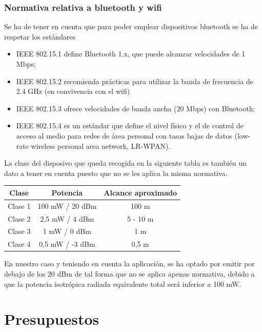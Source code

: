 \documentclass[paper=a4, fontsize=11pt,twoside]{scrartcl}	%
\begin{document}
        \subsubsection{Normativa relativa a bluetooth y wifi}
            Se ha de tener en cuenta que para poder emplear dispositivos bluetooth se ha de respetar los estándares
            \begin{itemize}
                \item IEEE 802.15.1 define Bluetooth 1.x, que puede alcanzar velocidades de 1 Mbps;
                \item IEEE 802.15.2 recomienda prácticas para utilizar la banda de frecuencia de 2.4 GHz (en convivencia con el wifi)
                \item IEEE 802.15.3 ofrece velocidades de banda ancha (20 Mbps) con Bluetooth;
                \item IEEE 802.15.4 es un estándar que define el nivel físico y el de control de acceso al medio 
                para redes de área personal con tasas bajas de datos (low-rate wireless personal area network, LR-WPAN).
            \end{itemize}
            La clase del disposivo que queda recogida en la siguiente tabla es también un dato a tener en cuenta puesto que no 
            se les aplica la misma normativa.
            \begin{center}
                \begin{tabular}{||c | c |c ||} 
                \hline
                Clase & Potencia  & Alcance aproximado\\ [0.5ex] 
                \hline\hline
                Clase 1 & 100 mW / 20 dBm & 100 m \\ 
                Clase 2 & 2,5 mW / 4 dBm & 5 - 10 m \\ 
                Clase 3 & 1 mW / 0 dBm & 1 m \\ 
                Clase 4 & 0,5 mW / -3 dBm & 0,5 m \\ 
                \hline
                \end{tabular}
            \end{center}
            En nuestro caso y teniendo en cuenta la aplicación, se ha optado por emitir por debajo de los 20 dBm de tal forma
            que no se aplica apenas normativa, debido a que la potencia isotrópica radiada equivalente total será
            inferior a 100 mW.
\section{Presupuestos}
\end{document}
